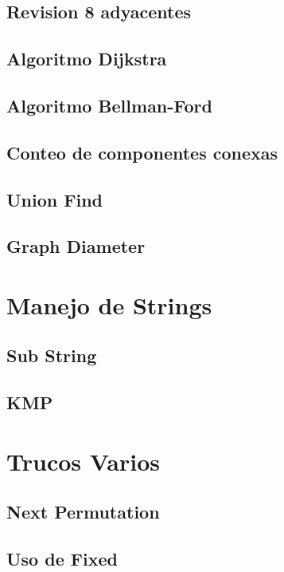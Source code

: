 \documentclass[10pt,landscape,twocolumn,a4paper,notitlepage]{article}
\begin{document}
\subsection{Revision 8 adyacentes}
\subsection{Algoritmo Dijkstra}
\subsection{Algoritmo Bellman-Ford}
\subsection{Conteo de componentes conexas}
\subsection{Union Find}
\subsection{Graph Diameter}


\section{Manejo de Strings}
\subsection{Sub String}
\subsection{KMP}
\section{Trucos Varios}
\subsection{Next Permutation}
\subsection{Uso de Fixed}
\end{document}
